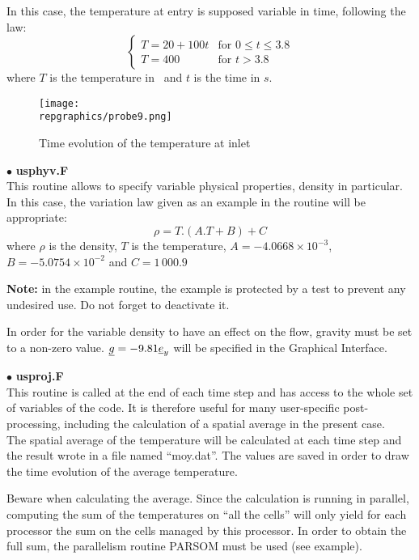 In this case, the temperature at entry is supposed variable in time, following
the law:
\begin{equation}
\left\{\begin{array}{ll}
T = 20 + 100t & \text{for }0\leqslant t \leqslant 3.8\\ 
T = 400 & \text{for } t > 3.8
\end{array}\right.
\end{equation}
where $T$ is the temperature in \degresC\ and $t$ is the time in $s$.


\begin{figure}[h!]
\begin{center}
\texttt{[image: \\repgraphics/probe9.png]} 
\caption{Time evolution of the temperature at inlet}
\label{figp9_e4}
\end{center}
\end{figure}


$\bullet$ {\bfseries usphyv.F}\\
This routine allows to specify variable physical properties, density in
particular. In this case, the variation law given as an example in the routine
will be appropriate:
\begin{equation}
\rho = T.(A.T + B) + C
\end{equation}
where $\rho$ is the density, $T$ is the temperature, $A = -4.0668\times10^{-3}$,
$B =-5.0754\times 10^{-2}$ and $C = 1\,000.9$ 

\textbf{Note:} in the example routine, the example is protected by a test to prevent any
undesired use. Do not forget to deactivate it.

In order for the variable density to have an effect on the flow, gravity must be
set to a non-zero value. $\underline{g} = -9.81 \underline{e}_y$ will be specified in the
Graphical Interface.	


$\bullet$ {\bfseries usproj.F}\\
This routine is called at the end of each time step and has access to the whole
set of variables of the code. It is therefore useful for many user-specific
post-processing, including the calculation of a spatial average in the present
case.\\
The spatial average of the temperature will be calculated at each time step and
the result wrote in a file named ``moy.dat''. The values are saved in order
to draw the time evolution of the average temperature.

Beware when calculating the average. Since the calculation is running in
parallel, computing the sum of the temperatures on ``all the cells'' will only
yield for each processor the sum on the cells managed by this processor. In
order to obtain the full sum, the parallelism routine PARSOM must be used (see
example).

